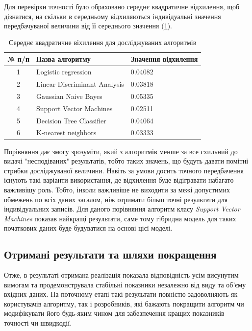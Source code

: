 Для перевірки точності було обраховано середнє квадратичне відхилення, щоб дізнатися, на скільки в середньому відхиляються індивідуальні значення передбачуваної величини від її середнього значення (\ref{tab:standard_deviation}).

\begin{table}[h!]
	\begin{tabularx}{\textwidth}{|c|X|X|}
    \hline
    № п/п & Назва алгоритму & Значення відхилення \\ \hline
    1 & Logistic regression & 0.04082 \\ \hline
    2 & Linear Discriminant Analysis & 0.03818 \\ \hline
    3 & Gaussian Naive Bayes & 0.05335 \\ \hline
    4 & Support Vector Machines & 0.02511 \\ \hline
    5 & Decision Tree Classifier & 0.04064 \\ \hline
    6 & K-nearest neighbors & 0.03333 \\
    \hline
    \end{tabularx}
\caption{Середнє квадратичне віхилення для досліджуваних алгоритмів} \label{tab:standard_deviation}
\end{table}

Порівняння дає змогу зрозуміти, який з алгоритмів менше за все схильний до видачі "несподіваних" результатів, тобто таких значень, що будуть давати помітні стрибки досліджуваної величини. Навіть за умови досить точного передбачення існують такі варіанти використання, де відхилення буде відігравати набагато важливішу роль. Тобто, інколи важливіше не виходити за межі допустимих обмежень по всіх даних загалом, ніж отримати більш точні результати для індивідуальних записів. Для даного порівняння алгоритм класу \textit{Support Vector Machines} показав найкращі результати, саме тому гібридна модель для таких початкових даних буде будуватися на основі цієї моделі.

\subsection{Отримані результати та шляхи покращення}
Отже, в результаті отримана реалізація показала відповідність усім висунутим вимогам та продемонструвала стабільні показники незалежно від виду та об'єму вхідних даних. На поточному етапі такі результати повністю задоволняють як користувачів алгоритму, так і розробників, які бажають покращити алгоритм чи модифікувати його будь-яким чином для забезпечення кращих показників точності чи швидкодії.

